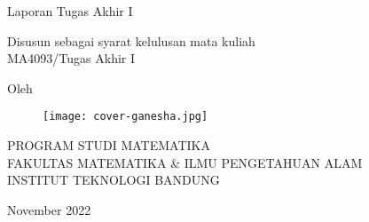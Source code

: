 \clearpage
\pagestyle{empty}

\begin{center}
    \smallskip

    \Large \bfseries \MakeUppercase{\thetitle}
    \vfill

    \Large Laporan Tugas Akhir I
    \vfill

    \large Disusun sebagai syarat kelulusan mata kuliah \\
    MA4093/Tugas Akhir I
    \vfill

    \large Oleh

    \Large \theauthor

    \vfill
    \begin{figure}[h]
        \centering
        \texttt{[image: cover-ganesha.jpg]}
    \end{figure}
    \vfill

    \large
    \uppercase{
        Program Studi Matematika \\
        Fakultas Matematika \& Ilmu Pengetahuan Alam \\
        Institut Teknologi Bandung
    }

    November 2022

\end{center}

\clearpage
